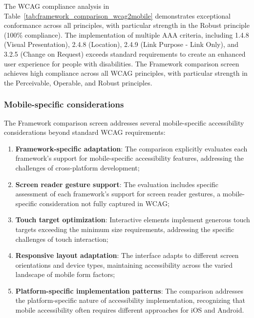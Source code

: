 \FloatBarrier

The WCAG compliance analysis in Table~\ref{tab:framework_comparison_wcag2mobile} demonstrates exceptional conformance across all principles, with particular strength in the Robust principle (100\% compliance). The implementation of multiple AAA criteria, including 1.4.8 (Visual Presentation), 2.4.8 (Location), 2.4.9 (Link Purpose - Link Only), and 3.2.5 (Change on Request) exceeds standard requirements to create an enhanced user experience for people with disabilities. 
The Framework comparison screen achieves high compliance across all WCAG principles, with particular strength in the Perceivable, Operable, and Robust principles.

\subsubsection{Mobile-specific considerations}

The Framework comparison screen addresses several mobile-specific accessibility considerations beyond standard WCAG requirements:

\begin{enumerate}
    \item \textbf{Framework-specific adaptation}: The comparison explicitly evaluates each framework's support for mobile-specific accessibility features, addressing the challenges of cross-platform development;
    
    \item \textbf{Screen reader gesture support}: The evaluation includes specific assessment of each framework's support for screen reader gestures, a mobile-specific consideration not fully captured in WCAG;
    
    \item \textbf{Touch target optimization}: Interactive elements implement generous touch targets exceeding the minimum size requirements, addressing the specific challenges of touch interaction;
    
    \item \textbf{Responsive layout adaptation}: The interface adapts to different screen orientations and device types, maintaining accessibility across the varied landscape of mobile form factors;
    
    \item \textbf{Platform-specific implementation patterns}: The comparison addresses the platform-specific nature of accessibility implementation, recognizing that mobile accessibility often requires different approaches for iOS and Android.
\end{enumerate}

